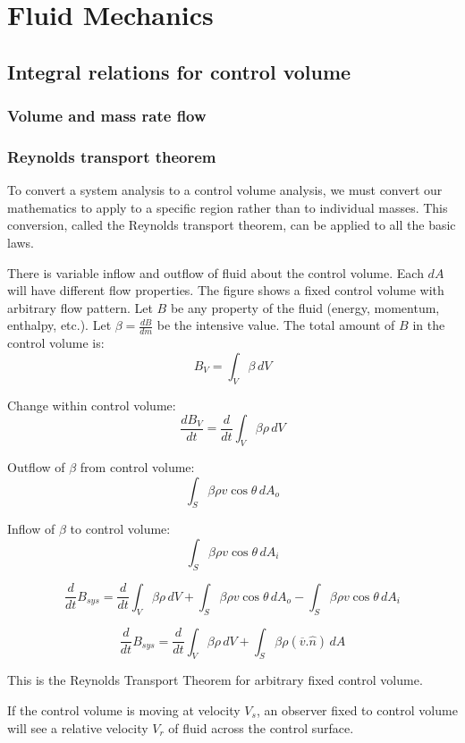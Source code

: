 \documentclass{report}
\begin{document}
 
\tableofcontents
\part{Fluid Mechanics}
\chapter{Integral relations for control volume}
\section{Volume and mass rate flow}

\section{Reynolds transport theorem}
To convert a system analysis to a control volume analysis, we must convert our mathematics to apply to a specific region rather than to individual masses. This conversion, called the Reynolds transport theorem, can be applied to all the basic laws.

There is variable inflow and outflow of fluid about the control volume. Each \( dA \) will have different flow properties. The figure shows a fixed control volume with arbitrary flow pattern.
Let \( B \) be any property of the fluid (energy, momentum, enthalpy, etc.). Let \( \beta = \frac{dB}{dm} \) be the intensive value.
The total amount of \( B \) in the control volume is:
\[ B_V = \int_V \beta \, dV \]

Change within control volume:
\[ \frac{dB_V}{dt} = \frac{d}{dt} \int_V \beta\rho \,dV \]

Outflow of \( \beta \) from control volume:
\[ \int_S \beta\rho v \cos\theta \,dA_o \]

Inflow of \( \beta \) to control volume:
\[ \int_S \beta\rho v \cos\theta \,dA_i \]

\[ \frac{d}{dt} B_{sys} = \frac{d}{dt} \int_V \beta\rho \,dV + \int_S \beta\rho v \cos\theta \,dA_o - \int_S \beta\rho v \cos\theta \,dA_i \]

\[ \frac{d}{dt} B_{sys} = \frac{d}{dt} \int_V \beta\rho \,dV + \int_S \beta\rho (\overline{v}.\hat{n}) \,dA \]

This is the Reynolds Transport Theorem for arbitrary fixed control volume.

If the control volume is moving at velocity \( V_s \), an observer fixed to control volume will see a relative velocity \( V_r \) of fluid across the control surface.
\end{document}
